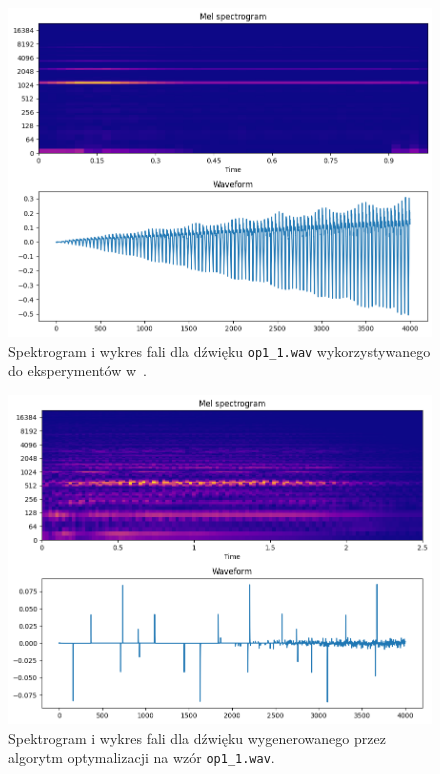 \begin{figure}[H]
    \centering
    \includegraphics[width=0.7\linewidth]{rys06/target_sample_op1_literature.png}
    \caption{
      Spektrogram i wykres fali dla dźwięku \texttt{op1\_1.wav} wykorzystywanego
      do eksperymentów w~\cite{evolutionary_puredata_results}.
    }\label{fig:literature_op_1_sound_overview}
\end{figure}


\begin{figure}[H]
    \centering
    \includegraphics[width=0.7\linewidth]{rys06/evolved_sample_op1.png}
    \caption{
      Spektrogram i wykres fali dla dźwięku wygenerowanego
      przez algorytm optymalizacji na wzór \texttt{op1\_1.wav}.
    }\label{fig:evolved_op1_sound_overview}
\end{figure}


